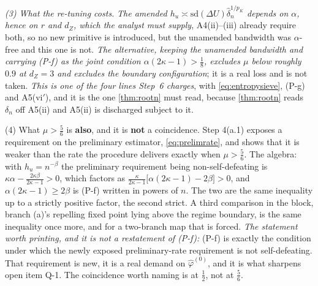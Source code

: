 \begin{remark}
\emph{(3) What the re-tuning costs.} \emph{The amended $h_u\asymp\mathrm{sd}(\Delta U)
\hat\delta_n^{1/p_K}$ depends on $\alpha$, hence on $r$ and
$d_Z$, which the analyst must supply}, A4(ii)--(iii) already require both, so no new
primitive is introduced, but the unamended bandwidth was $\alpha$-free and this one is not.
\emph{The alternative, keeping the unamended bandwidth and carrying (P-f) as the joint
condition $\alpha(2\kappa-1)>\tfrac18$, excludes $\mu$ below roughly $0.9$ at $d_Z=3$ and excludes the
boundary configuration}; it is a real loss and is not taken. \emph{This is one of the four lines
Step~6 charges}, with \eqref{eq:entropysieve}, (P-g) and A5(vi$'$), and it is the one
\cref{thm:rootn} must read, because \cref{thm:rootn} reads $\delta_n$ off A5(ii) and A5(ii) is
discharged subject to it.

(4) What $\mu>\tfrac56$ is \textbf{also}, and it is \textbf{not} a coincidence. 
Step 4(a.1) exposes a requirement on the preliminary estimator, \eqref{eq:prelimrate}, and shows that it
is weaker than the rate the procedure delivers exactly when $\mu>\tfrac56$. The algebra: with
$h_u=n^{-\beta}$ the preliminary requirement being non-self-defeating is
$\kappa\alpha-\tfrac{2\kappa\beta}{2\kappa-1}>0$, which factors as
$\tfrac{\kappa}{2\kappa-1}\big[\alpha(2\kappa-1)-2\beta\big]>0$, and $\alpha(2\kappa-1)\ge2\beta$ is
(P-f) written in powers of $n$. The two are the same inequality up to a strictly positive factor,
the second strict. A third comparison in the block, branch (a)'s repelling fixed point lying above
the regime boundary, is the same inequality once more, and for a two-branch map that is forced.
\emph{The statement worth printing, and it is not a restatement of (P-f):} (P-f) is exactly the
condition under which the newly exposed preliminary-rate requirement is not self-defeating. That
requirement is new, it is a real demand on $\hat\varphi^{(0)}$, and it is what sharpens open item Q-1.
The coincidence worth naming is at $\tfrac12$, not at $\tfrac56$.


\end{remark}
